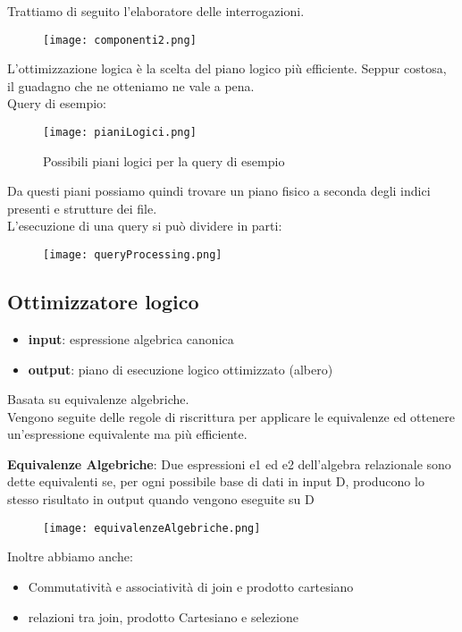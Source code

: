 Trattiamo di seguito l'elaboratore delle interrogazioni.
\begin{figure}[h]
    \centering
    \texttt{[image: componenti2.png]}
    \label{fig:componenti2}
\end{figure}
L'ottimizzazione logica \`e la scelta del piano logico più efficiente. Seppur costosa, il guadagno che ne otteniamo ne vale a pena.\\
Query di esempio:\\

\begin{figure}[htbp]
    \centering
    \texttt{[image: pianiLogici.png]}
    \caption{Possibili piani logici per la query di esempio}
    \label{fig:pianiLogici}
\end{figure}
Da questi piani possiamo quindi trovare un piano fisico a seconda degli indici presenti e strutture dei file.\\
L'esecuzione di una query si può dividere in parti:
\begin{figure}[htbp]
    \centering
    \texttt{[image: queryProcessing.png]}
    \label{fig:queryProcessing}
\end{figure}

\break

\subsection{Ottimizzatore logico}
\begin{itemize}
    \item \textbf{input}: espressione algebrica canonica
    \item \textbf{output}: piano di esecuzione logico ottimizzato (albero)
\end{itemize}
Basata su equivalenze algebriche.\\
Vengono seguite delle regole di riscrittura per applicare le equivalenze ed ottenere un'espressione equivalente ma più efficiente.\\
\begin{definition} \textbf{Equivalenze Algebriche}: Due espressioni e1 ed e2 dell'algebra relazionale sono dette equivalenti se, per ogni possibile base di dati in input D, producono lo stesso risultato in output quando vengono eseguite su D
\end{definition}
\begin{figure}[htbp]
    \centering
    \texttt{[image: equivalenzeAlgebriche.png]}
    \label{fig:equivalenzeAlgebriche}
\end{figure}
Inoltre abbiamo anche:
\begin{itemize}
    \item Commutatività e associatività di join e prodotto cartesiano
    \item relazioni tra join, prodotto Cartesiano e selezione
\end{itemize}

